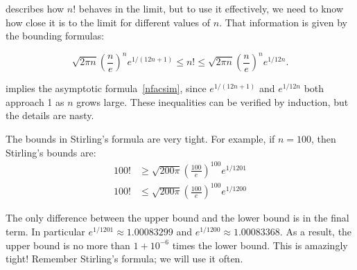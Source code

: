  describes how $n!$ behaves in the limit, but to
use it effectively, we need to know how close it is to the limit for
different values of $n$.  That information is given by the bounding
formulas:
\begin{fact*}
\[
\sqrt{2 \pi n} \left(\frac{n}{e}\right)^n e^{1/(12n+1)} \leq n! \leq
\sqrt{2 \pi n} \left(\frac{n}{e}\right)^n e^{1/12n}.
\]
\end{fact*}
 implies the asymptotic
formula~\eqref{nfacsim}, since $e^{1/(12n+1)}$ and $e^{1/12n}$ both
approach 1 as $n$ grows large.  These inequalities can be verified by
induction, but the details are nasty.

The bounds in Stirling's formula are very tight.  For example, if $n =
100$, then Stirling's bounds are:
\begin{align*}
100! & \geq  \sqrt{200 \pi} \left(\frac{100}{e}\right)^{100} e^{1/1201} \\
100! & \leq  \sqrt{200 \pi} \left(\frac{100}{e}\right)^{100} e^{1/1200}
\end{align*}

The only difference between the upper bound and the lower bound is in
the final term.  In particular $e^{1/1201} \approx 1.00083299$ and
$e^{1/1200} \approx 1.00083368$.  As a result, the upper bound is no
more than $1 + 10^{-6}$ times the lower bound.  This is amazingly
tight!  Remember Stirling's formula; we will use it often.

